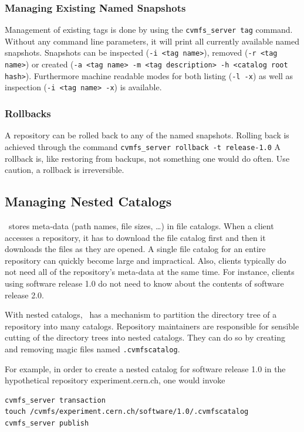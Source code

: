 \subsubsection{Managing Existing Named Snapshots}
Management of existing tags is done by using the \texttt{cvmfs\_server tag} command.
Without any command line parameters, it will print all currently available named snapshots.
Snapshots can be inspected (\texttt{-i <tag name>}), removed (\texttt{-r <tag name>}) or created (\texttt{-a <tag name> -m <tag description> -h <catalog root hash>}).
Furthermore machine readable modes for both listing (\texttt{-l -x}) as well as inspection (\texttt{-i <tag name> -x}) is available.

\subsubsection{Rollbacks}
A repository can be rolled back to any of the named snapshots.
Rolling back is achieved through the command \texttt{cvmfs\_server rollback -t release-1.0}
A rollback is, like restoring from backups, not something one would do often.
Use caution, a rollback is irreversible.


\subsection{Managing Nested Catalogs}

\cvmfs\ stores meta-data (path names, file sizes, \dots) in file catalogs.
When a client accesses a repository, it has to download the file catalog first and then it downloads the files as they are opened.
A single file catalog for an entire repository can quickly become large and impractical.
Also, clients typically do not need all of the repository's meta-data at the same time.
For instance, clients using software release 1.0 do not need to know about the contents of software release 2.0.

With nested catalogs, \cvmfs\ has a mechanism to partition the directory tree of a repository into many catalogs.
Repository maintainers are responsible for sensible cutting of the directory trees into nested catalogs.
They can do so by creating and removing magic files named \texttt{.cvmfscatalog}.

For example, in order to create a nested catalog for software release 1.0 in the hypothetical repository experiment.cern.ch, one would invoke
\begin{verbatim}
cvmfs_server transaction
touch /cvmfs/experiment.cern.ch/software/1.0/.cvmfscatalog
cvmfs_server publish
\end{verbatim}

